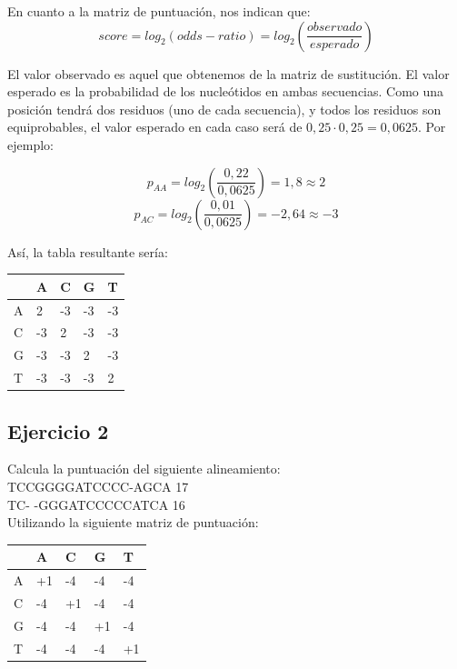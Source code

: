 En cuanto a la matriz de puntuación, nos indican que:
$$score = log_2(odds-ratio) = log_2(\frac{observado}{esperado})$$

El valor observado es aquel que obtenemos de la matriz de sustitución. El valor esperado es la probabilidad de los nucleótidos en ambas secuencias. Como una posición tendrá dos residuos (uno de cada secuencia), y todos los residuos son equiprobables, el valor esperado en cada caso será de $0,25 \cdot 0,25 = 0,0625$. Por ejemplo:

$$p_{AA} = log_2(\frac{0,22}{0,0625}) = 1,8 \approx 2$$
$$p_{AC} = log_2(\frac{0,01}{0,0625}) = -2,64 \approx -3$$

Así, la tabla resultante sería:

\begin{table}[htbp]
    \centering
    \begin{tabularx}{\textwidth}{ X | X X X X}
          & A & C & G & T \\ \hline
         A & 2 & -3 & -3 & -3 \\
         C & -3 & 2& -3 & -3 \\
         G & -3 & -3 & 2 & -3 \\
         T & -3 & -3 & -3 & 2 \\
    \end{tabularx}
\end{table}

\subsection{Ejercicio 2}
Calcula la puntuación del siguiente alineamiento: \\
TCCGGGGATCCCC-AGCA 17\\
TC- -GGGATCCCCCATCA 16\\ 
Utilizando la siguiente matriz de puntuación:

\begin{table}[htbp]
    \centering
    \begin{tabularx}{\textwidth}{ X X X X X}
          & A & C & G & T \\ \hline
         A & +1 & -4 & -4 & -4 \\
         C & -4 & +1 & -4 & -4 \\
         G & -4 & -4 & +1 & -4 \\
         T & -4 & -4 & -4 & +1 \\
    \end{tabularx}
\end{table}


